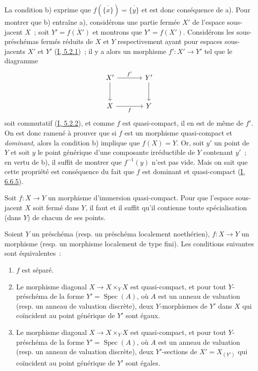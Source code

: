 La condition b) exprime que $f(\overline{\{x\}})=\overline{\{y\}}$ et est donc
conséquence de a). Pour montrer que b) entraîne a), considérons une partie
fermée $X'$ de l'espace sous-jacent $X$~; soit $Y'=\overline{f(X')}$ et
montrons que $Y'=f(X')$. Considérons les sous-préschémas fermés réduits de
$X$ et $Y$ respectivement ayant pour espaces sous-jacents $X'$ et $Y'$
(\hyperref[I.5.2.1-fr]{I, 5.2.1})~; il y a alors un morphisme $f':X'\to Y'$ tel
que le diagramme
\[
\begin{tikzcd}[column sep=large,row sep=large]
X' \arrow[r,"f'"] \arrow[d] & Y' \arrow[d] \\
X \arrow[r,"f"'] & Y
\end{tikzcd}
\]
soit commutatif (\hyperref[I.5.2.2-fr]{I, 5.2.2}), et comme $f$ est
quasi-compact, il en est de même de $f'$. On est donc ramené à prouver que si
$f$ est un morphisme quasi-compact et \emph{dominant}, alors la
condition b) implique que $f(X)=Y$. Or, soit $y'$ un point de $Y$ et soit $y$
le point générique d'une composante irréductible de $Y$ contenant $y'$~; en
vertu de b), il suffit de montrer que $f^{-1}(y)$ n'est pas vide. Mais on sait
que cette propriété est conséquence du fait que $f$ est dominant et
quasi-compact (\hyperref[I.6.6.5-fr]{I, 6.6.5}).

\begin{corollary}[7.2.2]
\label{II.7.2.2-fr}
Soit $f:X\to Y$ un morphisme d'immersion quasi-compact. Pour que l'espace
sous-jacent $X$ soit fermé dans $Y$, il faut et il suffit qu'il contienne toute
spécialisation (dans $Y$) de chacun de ses points.
\end{corollary}

\begin{proposition}[7.2.3]
\label{II.7.2.3-fr}
Soient $Y$ un préschéma (resp. un préschéma localement noethérien), $f:X\to Y$
un morphisme (resp. un morphisme localement de type fini). Les conditions
suivantes sont équivalentes~:
\begin{enumerate}
\item[\rm a)] $f$ est séparé.
\item[\rm b)] Le morphisme diagonal $X\to X\times_YX$ est quasi-compact, et
pour tout $Y$-préschéma de la forme $Y'=\operatorname{Spec}(A)$, où $A$ est un
anneau de valuation (resp. un anneau de valuation discrète), deux
$Y$-morphismes de $Y'$ dans $X$ qui coïncident au point générique de $Y'$ sont
égaux.
\item[\rm c)] Le morphisme diagonal $X\to X\times_YX$ est quasi-compact, et
pour tout $Y$-préschéma de la forme $Y'=\operatorname{Spec}(A)$, où $A$ est un
anneau de valuation (resp. un anneau de valuation discrète), deux
$Y'$-sections de $X'=X_{(Y')}$ qui coïncident au point générique de $Y'$ sont
égales.
\end{enumerate}
\end{proposition}

